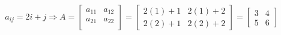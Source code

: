 \documentclass[preview]{standalone}
\begin{document}
\begin{align*}
a_{ij} = 2i + j \Rightarrow A = \begin{bmatrix} a_{11} & a_{12}\\ a_{21} & a_{22}\\ \end{bmatrix}= \begin{bmatrix} 2(1) + 1 & 2(1) + 2 \\ 2(2) + 1 & 2(2) + 2 \end{bmatrix}= \begin{bmatrix} 3 & 4 \\ 5 & 6 \end{bmatrix}
\end{align*}
\end{document}
